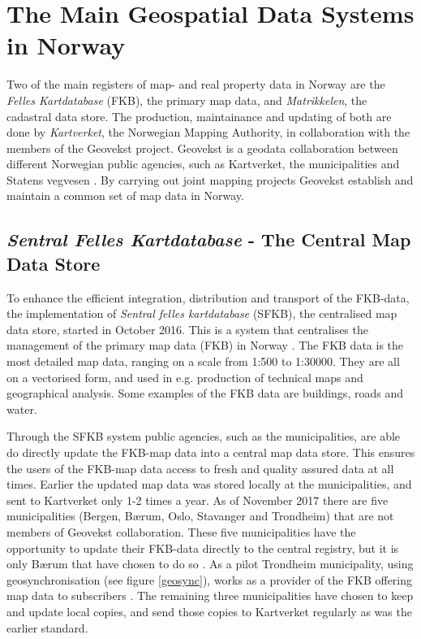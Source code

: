 
\chapter{The Main Geospatial Data Systems in Norway}\label{chap:examples}
Two of the main registers of map- and real property data in Norway are the \textit{Felles Kartdatabase} (FKB), the primary map data,  and \textit{Matrikkelen}, the cadastral data store. The production, maintainance and updating of both are done by \textit{Kartverket}, the Norwegian Mapping Authority, in collaboration with the members of the Geovekst project. Geovekst is a geodata collaboration between different Norwegian public agencies, such as Kartverket, the municipalities and Statens vegvesen \citep{Kartverket2017a}. By carrying out joint mapping projects Geovekst establish and maintain a common set of map data in Norway. 

\section{\textit{Sentral Felles Kartdatabase} - The Central Map Data Store}\label{SFKB}
To enhance the efficient integration, distribution and transport of the FKB-data, the implementation of \textit{Sentral felles kartdatabase} (SFKB), the centralised map data store, started in October 2016. This is a system that centralises the management of the primary map data (FKB) in Norway \citep{Kartverket2017}. The FKB data is the most detailed map data, ranging on a scale from 1:500 to 1:30000. They are all on a vectorised form, and used in e.g. production of technical maps and geographical analysis. Some examples of the FKB data are buildings, roads and water. 

Through the SFKB system public agencies, such as the municipalities, are able do directly update the FKB-map data into a central map data store. This ensures the users of the FKB-map data access to fresh and quality assured data at all times. Earlier the updated map data was stored locally at the municipalities, and sent to Kartverket only 1-2 times a year. As of November 2017 there are five municipalities (Bergen, Bærum, Oslo, Stavanger and Trondheim) that are not members of Geovekst collaboration. These five municipalities have the opportunity to update their FKB-data directly to the central registry, but it is only Bærum that have chosen to do so \citep{Kartverket2017}. As a pilot Trondheim municipality, using geosynchronisation (see figure \ref{geosync}), works as a provider of the FKB offering map data to subscribers \citep{Saether2016,Sandal2016}. The remaining three municipalities have chosen to keep and update local copies, and send those copies to Kartverket regularly as was the earlier standard.

